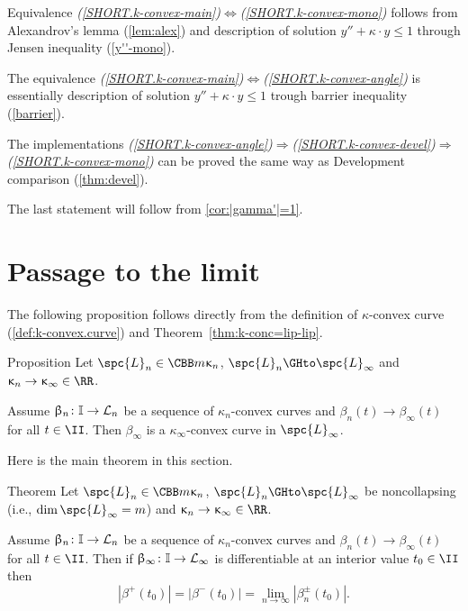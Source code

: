  Equivalence {\it (\ref{SHORT.k-convex-main})$\Leftrightarrow$(\ref{SHORT.k-convex-mono})} follows from Alexandrov's lemma (\ref{lem:alex}) and description of solution $y''+\kappa\cdot  y\le 1$ through Jensen inequality (\ref{y''-mono}).

The equivalence {\it(\ref{SHORT.k-convex-main})$\Leftrightarrow$(\ref{SHORT.k-convex-angle})} is essentially description of solution $y''+\kappa\cdot  y\le 1$ trough barrier inequality (\ref{barrier}).

The implementations {\it(\ref{SHORT.k-convex-angle})$\Rightarrow$(\ref{SHORT.k-convex-devel})$\Rightarrow$(\ref{SHORT.k-convex-mono})} can be proved the same way as Development comparison (\ref{thm:devel}).

The last statement will follow from \ref{cor:|gamma'|=1}.%
\qeds













\section{Passage to the limit}

The following proposition follows directly from the definition of $\kappa$-convex curve (\ref{def:k-convex.curve}) and Theorem~\ref{thm:k-conc=lip-lip}.

\begin{thm}{Proposition}\label{prop:lim-length}
Let 
$\spc{L}_n\in\CBB m{\kappa_n}$, 
$\spc{L}_n\GHto \spc{L}_\infty$
and $\kappa_n\to\kappa_\infty\in\RR$.

Assume $\beta_n\:\II\to \spc{L}_n$ be a sequence of $\kappa_n$-convex curves
and $\beta_n(t)\to \beta_\infty(t)$ for all $t\in\II$.
Then $\beta_\infty$ is a $\kappa_\infty$-convex curve in $\spc{L}_\infty$.
\end{thm}


Here is the main theorem in this section.

\begin{thm}{Theorem}\label{thm:lim-length}
Let 
$\spc{L}_n\in\CBB m{\kappa_n}$, 
$\spc{L}_n\GHto \spc{L}_\infty$ be noncollapsing (i.e., $\dim\spc{L}_\infty=m$)
and $\kappa_n\to\kappa_\infty\in\RR$.

Assume $\beta_n\:\II\to \spc{L}_n$ be a sequence of $\kappa_n$-convex curves
and $\beta_n(t)\to \beta_\infty(t)$ for all $t\in\II$.
Then if $\beta_\infty\:\II\to\spc{L}_\infty$ is differentiable at an interior value $t_0\in\II$
then 
\[|\beta^+(t_0)|=|\beta^-(t_0)|=\lim_{n\to\infty} |\beta_n^\pm(t_0)|.\]

\end{thm}


